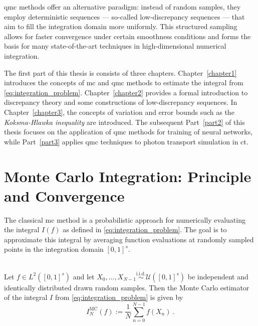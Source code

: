 \ac{qmc} methods offer an alternative paradigm: instead of random samples, they
employ deterministic sequences --- so-called low-discrepancy sequences --- that
aim to fill the integration domain more uniformly. This structured sampling
allows for faster convergence under certain smoothness conditions and forms the
basis for many state-of-the-art techniques in high-dimensional numerical
integration.

The first part of this thesis is consists of three chapters.
Chapter~\ref{chapter1} introduces the concepts of \ac{mc} and \ac{qmc} methods
to estimate the integral from \eqref{eq:integration_problem}.
Chapter~\ref{chapter2} provides a formal introduction to discrepancy theory and
some constructions of low-discrepancy sequences. In Chapter~\ref{chapter3}, the
concepts of variation and error bounds such as the \emph{Koksma-Hlawka
inequality} are introduced. The subsequent Part~\ref{part2} of this thesis
focuses on the application of \ac{qmc} methods for training of neural networks,
while Part~\ref{part3} applies \ac{qmc} techniques to photon transport
simulation in \acl{ct}.


\section{Monte Carlo Integration: Principle and Convergence}
The classical \ac{mc} method is a probabilistic approach for numerically
evaluating the integral $I(f)$ as defined in \eqref{eq:integration_problem}. The
goal is to approximate this integral by averaging function evaluations at
randomly sampled points in the integration domain $[0,1]^s$.

\begin{definition} \ \\
\label{def:mc-estimator}
Let $f \in L^2([0,1]^s)$ and let $X_0, \dots, X_{N-1}
\stackrel{\mathrm{i.i.d.}}{\sim} \mathcal{U}([0,1]^s)$ be independent and
identically distributed drawn random samples. Then the Monte Carlo estimator of
the integral $I$ from \eqref{eq:integration_problem} is given by
\begin{equation}
    \label{eq:mc-estimator}
    I_N^{\mathrm{MC}}(f) := \frac{1}{N} \sum_{n=0}^{N-1} f(X_n)\,.
\end{equation}
\end{definition}

